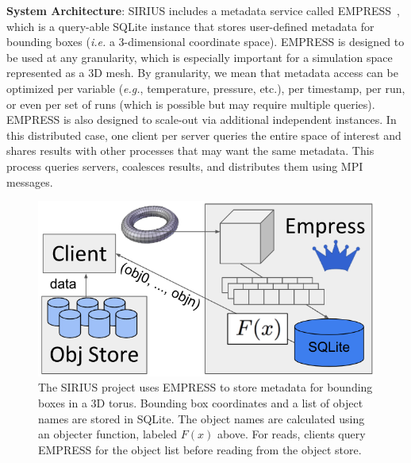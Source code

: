 \textbf{System Architecture}: SIRIUS includes a metadata service called
EMPRESS~\cite{lawson:pdsw17-empress}, which is a query-able SQLite instance
that stores user-defined metadata for bounding boxes ({\it i.e.} a
3-dimensional coordinate space).  EMPRESS is designed to be used at any
granularity, which is especially important for a simulation space represented
as a 3D mesh. By granularity, we mean that metadata access can be optimized per
variable ({\it e.g.}, temperature, pressure, etc.), per timestamp, per run, or
even per set of runs (which is possible but may require multiple queries).
EMPRESS is also designed to scale-out via additional independent instances. In
this distributed case, one client per server queries the entire space of
interest and shares results with other processes that may want the same
metadata. This process queries servers, coalesces results, and distributes them
using MPI messages.


\begin{figure}[tb]
\centering
  \includegraphics[width=1\linewidth]{figures/empress.png}
  \caption{The SIRIUS project uses EMPRESS to store metadata for bounding boxes
in a 3D torus. Bounding box coordinates and a list of object names are stored
in SQLite. The object names are calculated using an objecter function, labeled
\(F(x)\) above. For reads, clients query EMPRESS for the object list before
reading from the object store.}
  \label{fig:empress}
\end{figure}

